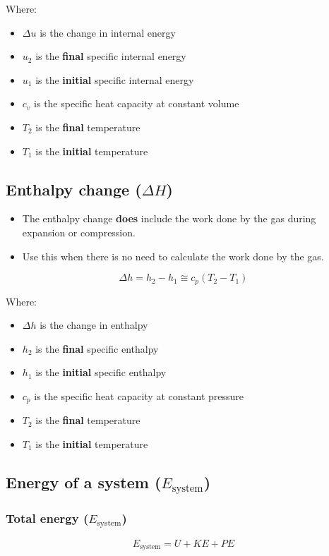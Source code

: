 \documentclass[11pt]{article}
\begin{document}
Where:
\begin{itemize}
\item \(\Delta u\) is the change in internal energy
\item \(u_2\) is the \textbf{final} specific internal energy
\item \(u_1\) is the \textbf{initial} specific internal energy
\item \(c_v\) is the specific heat capacity at constant volume
\item \(T_2\) is the \textbf{final} temperature
\item \(T_1\) is the \textbf{initial} temperature
\end{itemize}

\newpage

\subsection{Enthalpy change (\(\Delta H\))}
\label{sec:org99a5c03}
\begin{itemize}
\item The enthalpy change \textbf{does} include the work done by the gas during expansion or compression.
\item Use this when there is no need to calculate the work done by the gas.
\end{itemize}
\[\Delta h = h_2 - h_1 \cong c_p \left(T_2 - T_1 \right)\]

Where:
\begin{itemize}
\item \(\Delta h\) is the change in enthalpy
\item \(h_2\) is the \textbf{final} specific enthalpy
\item \(h_1\) is the \textbf{initial} specific enthalpy
\item \(c_p\) is the specific heat capacity at constant pressure
\item \(T_2\) is the \textbf{final} temperature
\item \(T_1\) is the \textbf{initial} temperature
\end{itemize}

\subsection{Energy of a system (\(E_{\text{system}}\))}
\label{sec:orgb4eccf3}

\subsubsection{Total energy (\(E_{\text{system}}\))}
\label{sec:orgc3b4819}
\[E_{\text{system}} = U + KE + PE\]
\end{document}
